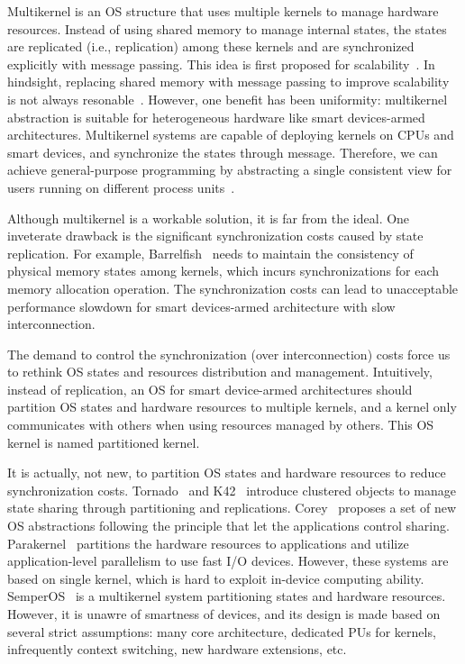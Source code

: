 Multikernel is an OS structure that uses multiple kernels to manage hardware resources.
Instead of using shared memory to manage internal states, the states are replicated (i.e., replication) among these kernels and are synchronized explicitly with message passing.
This idea is first proposed for scalability~\cite{baumann2009multikernel}.
In hindsight, replacing shared memory with message passing to improve scalability is not always resonable~\cite{barbalace2015popcorn, barbalace2017s}.
However, one benefit has been uniformity: multikernel abstraction is suitable for heterogeneous hardware like smart devices-armed architectures.
Multikernel systems are capable of deploying kernels on CPUs and smart devices, and synchronize the states through message.
Therefore, we can achieve general-purpose programming by abstracting a single consistent view for users running on different process units~\cite{barbalace2015popcorn}.

Although multikernel is a workable solution, it is far from the ideal.
One inveterate drawback is the significant synchronization costs caused by state replication.
For example, Barrelfish~\cite{baumann2009multikernel} needs to maintain the consistency of physical memory states among kernels, which incurs synchronizations for each memory allocation operation.
The synchronization costs can lead to unacceptable performance slowdown for smart devices-armed architecture with slow interconnection.

The demand to control the synchronization (over interconnection) costs force us to rethink OS states and resources distribution and management.
Intuitively, instead of replication, an OS for smart device-armed architectures should partition OS states and hardware resources to multiple kernels,
and a kernel only communicates with others when using resources managed by others.
This OS kernel is named partitioned kernel.

It is actually, not new, to partition OS states and hardware resources to reduce synchronization costs.
Tornado~\cite{gamsa1999tornado} and K42~\cite{appavoo2007experience} introduce clustered objects to manage state sharing through partitioning and replications.
Corey~\cite{boyd2008corey} proposes a set of new OS abstractions following the principle that let the applications control sharing.
Parakernel~\cite{enberg2019faster} partitions the hardware resources to applications and utilize application-level parallelism to use fast I/O devices.
However, these systems are based on single kernel, which is hard to exploit in-device computing ability.
SemperOS~\cite{hille2019semperos} is a multikernel system partitioning states and hardware resources.
However, it is unawre of smartness of devices, and its design is made based on several strict assumptions: many core architecture, dedicated PUs for kernels, infrequently context switching, new hardware extensions, etc.
\fi
